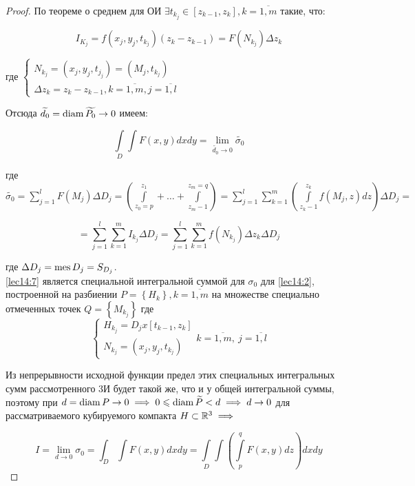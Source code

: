 \documentclass[../../main.tex]{subfiles}
\begin{document}
\begin{proof}
		По теореме о среднем для ОИ $\exists t_{k_{j}} \in \left[z_{k - 1}, z_k \right], k = \overline{1, m}$ такие, что:
		 
		 \begin{equation}
		 	I_{K_j} = f\left(x_j, y_j, t_{k_j}\right)\left(z_k - z_{k - 1}\right) = F\left(N_{k_j}\right) \Delta z_k \label{lec14:5}
		 \end{equation}
		
		где $\begin{cases}
		N_{k_j} = (x_j, y_j, t_{j_j}) = (M_j, t_{k_j})\\
		\Delta z_k = z_k - z_{k - 1}, k = \overline{1, m}, j = \overline{1, l}
		\end{cases}$
		
		Отсюда $\widetilde{d_0} = \operatorname{diam} \widetilde{P_0} \to 0$ имеем: 
		
		\begin{equation}
		\int\limits_D \int F\left(x, y\right) dxdy = \lim\limits_{\widetilde{d_0} \to 0} \widetilde{\sigma_0} \label{lec14:6}
		\end{equation}
		
		где $\widetilde{\sigma_0} = \sum\limits_{j = 1}^{l} F\left(M_j\right) \Delta D_j = \left(\int\limits_{z_0 = p}^{z_1} + \ldots + \int\limits_{z_m - 1}^{z_m = q} \right) = \sum\limits_{j = 1}^{l} \sum\limits_{k = 1}^{m} \left(\int\limits_{z_k - 1}^{z_k} f(M_j, z)dz\right) \Delta D_j = $
		
		\begin{equation}
		= \sum\limits_{j = 1}^{l} \sum\limits_{k = 1}^{m} I_{k_j} \Delta D_j = \sum\limits_{j = 1}^{l} \sum\limits_{k = 1}^{m} f\left(N_{k_j}\right) \Delta z_k \Delta D_j \label{lec14:7}
		\end{equation}
		
		где $\Delta D_j = \operatorname{mes} D_j = S_{D_j}$.\\
		
		\eqref{lec14:7} является специальной интегральной суммой для $\sigma_0$ для \eqref{lec14:2}, построенной на разбиении $P = \left\{ H_k \right\}, k = \overline{1, m}$ на множестве специально отмеченных точек $Q = \left\{ M_{k_j}\right\}$ где 
		\[
		\begin{cases}
		H_{k_j} = D_j x \left[t_{k - 1}, z_k\right]\\
		N_{k_j} = (x_j, y_j, t_{k_j})
		\end{cases} k = \overline{1, m}, \ j = \overline{1, l}
		\]
		
		Из непрерывности исходной функции предел этих специальных интегральных сумм рассмотренного 3И будет такой же, что и у общей интегральной суммы, поэтому при $d = \operatorname{diam} P \to 0 \implies 0 \leqslant \operatorname{diam} \widetilde{P} < d \implies d \to 0$ для рассматриваемого кубируемого компакта $H \subset \mathbb{R}^3 \implies$
		
		\begin{equation}
		I = \lim\limits_{d \to 0} \sigma_0 = \int_{D} \int F\left(x, y\right) dxdy = \int\limits_D \int \left(\int\limits_{p}^{q} F\left(x, y\right) dz\right) dxdy \label{lec14:9}
		\end{equation}
		
	\end{proof}
	
\end{document}
